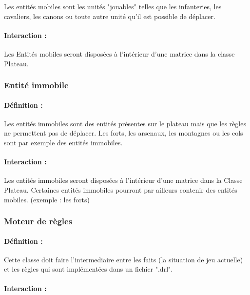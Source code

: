 \documentclass[12pt]{article}
\begin{document}
				Les entités mobiles sont les unités "jouables" telles que les infanteries, les cavaliers, les canons ou toute autre unité qu'il est possible de déplacer.

				\paragraph{Interaction :}

				Les Entités mobiles seront disposées à l'intérieur d'une matrice dans la classe Plateau.

			\subsubsection{Entité immobile}

				\paragraph{Définition :}

				Les entités immobiles sont des entités présentes sur le plateau mais que les règles ne permettent pas de déplacer. Les forts, les arsenaux, les montagnes ou les cols sont par exemple des entités immobiles.

				\paragraph{Interaction :}

				Les entités immobiles seront disposées à l'intérieur d'une matrice dans la Classe Plateau. Certaines entités immobiles pourront par ailleurs contenir des entités mobiles. (exemple : les forts)

			\subsubsection{Moteur de règles}

				\paragraph{Définition :}

				Cette classe doit faire l'intermediaire entre les faits (la situation de jeu actuelle) et les règles qui sont implémentées dans un fichier ".drl".

				\paragraph{Interaction :}
\end{document}
